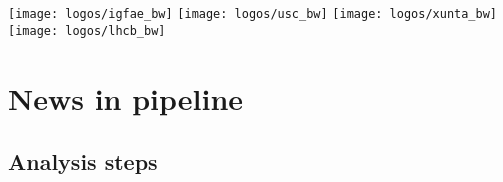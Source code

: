 \documentclass[9pt,aspectratio=43]{beamer}
\begin{document}




\begin{frame}[plain,overlaytitlepage=0.9]
  \begin{minipage}[b][\textheight][b]{5cm}
    \texttt{[image: logos/igfae\_bw]}\hspace{1mm}
    \texttt{[image: logos/usc\_bw]}\hspace{1mm}
    \texttt{[image: logos/xunta\_bw]}\hspace{1mm}\\[2mm]
    \texttt{[image: logos/lhcb\_bw]}\\[-1mm]
  \end{minipage}
\end{frame}

\begin{frame}[plain,overlaytoc=0.9]
  \addtocounter{framenumber}{-1}
  \hspace*{5.3cm}\begin{minipage}{8cm}
    \tableofcontents
  \end{minipage}
\end{frame}





\section{News in pipeline}


\subsection{Analysis steps}
\end{document}
